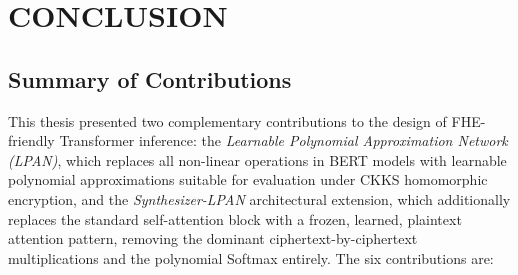\chapter{CONCLUSION}
\label{ch:conclusion}

\section{Summary of Contributions}

This thesis presented two complementary contributions to the design of FHE-friendly Transformer inference: the \emph{Learnable Polynomial Approximation Network (LPAN)}, which replaces all non-linear operations in BERT models with learnable polynomial approximations suitable for evaluation under CKKS homomorphic encryption, and the \emph{Synthesizer-LPAN} architectural extension, which additionally replaces the standard self-attention block with a frozen, learned, plaintext attention pattern, removing the dominant ciphertext-by-ciphertext multiplications and the polynomial Softmax entirely. The six contributions are:

